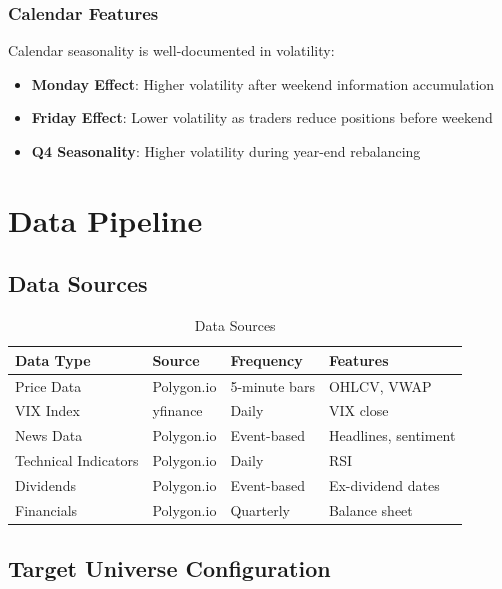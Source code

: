 \documentclass[12pt,a4paper]{article}
\begin{document}
\subsubsection{Calendar Features}

Calendar seasonality is well-documented in volatility:
\begin{itemize}
    \item \textbf{Monday Effect}: Higher volatility after weekend information accumulation
    \item \textbf{Friday Effect}: Lower volatility as traders reduce positions before weekend
    \item \textbf{Q4 Seasonality}: Higher volatility during year-end rebalancing
\end{itemize}

\section{Data Pipeline}

\subsection{Data Sources}

\begin{table}[H]
\centering
\begin{tabular}{llll}
\toprule
\textbf{Data Type} & \textbf{Source} & \textbf{Frequency} & \textbf{Features} \\
\midrule
Price Data & Polygon.io & 5-minute bars & OHLCV, VWAP \\
VIX Index & yfinance & Daily & VIX close \\
News Data & Polygon.io & Event-based & Headlines, sentiment \\
Technical Indicators & Polygon.io & Daily & RSI \\
Dividends & Polygon.io & Event-based & Ex-dividend dates \\
Financials & Polygon.io & Quarterly & Balance sheet \\
\bottomrule
\end{tabular}
\caption{Data Sources}
\label{tab:data_sources}
\end{table}

\subsection{Target Universe Configuration}
\end{document}
